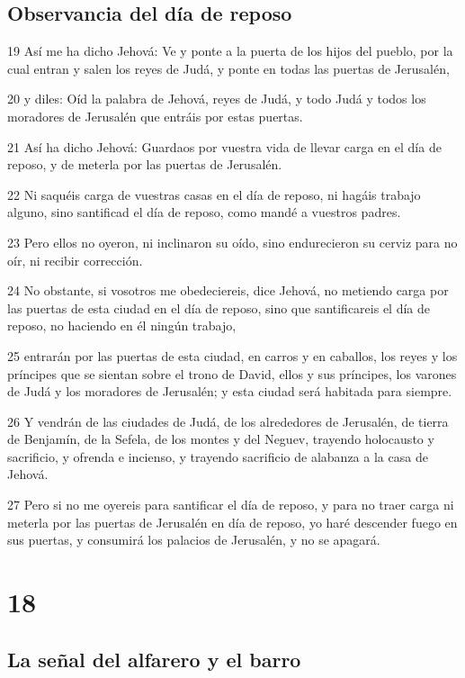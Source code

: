 \section*{Observancia del día de reposo}

\par 19 Así me ha dicho Jehová: Ve y ponte a la puerta de los hijos del pueblo, por la cual entran y salen los reyes de Judá, y ponte en todas las puertas de Jerusalén,
\par 20 y diles: Oíd la palabra de Jehová, reyes de Judá, y todo Judá y todos los moradores de Jerusalén que entráis por estas puertas.
\par 21 Así ha dicho Jehová: Guardaos por vuestra vida de llevar carga en el día de reposo, y de meterla por las puertas de Jerusalén. 
\par 22 Ni saquéis carga de vuestras casas en el día de reposo, ni hagáis trabajo alguno, sino santificad el día de reposo, como mandé a vuestros padres. 
\par 23 Pero ellos no oyeron, ni inclinaron su oído, sino endurecieron su cerviz para no oír, ni recibir corrección.
\par 24 No obstante, si vosotros me obedeciereis, dice Jehová, no metiendo carga por las puertas de esta ciudad en el día de reposo, sino que santificareis el día de reposo, no haciendo en él ningún trabajo,
\par 25 entrarán por las puertas de esta ciudad, en carros y en caballos, los reyes y los príncipes que se sientan sobre el trono de David, ellos y sus príncipes, los varones de Judá y los moradores de Jerusalén; y esta ciudad será habitada para siempre.
\par 26 Y vendrán de las ciudades de Judá, de los alrededores de Jerusalén, de tierra de Benjamín, de la Sefela, de los montes y del Neguev, trayendo holocausto y sacrificio, y ofrenda e incienso, y trayendo sacrificio de alabanza a la casa de Jehová.
\par 27 Pero si no me oyereis para santificar el día de reposo, y para no traer carga ni meterla por las puertas de Jerusalén en día de reposo, yo haré descender fuego en sus puertas, y consumirá los palacios de Jerusalén, y no se apagará.


\chapter{18}

\section*{La señal del alfarero y el barro}

